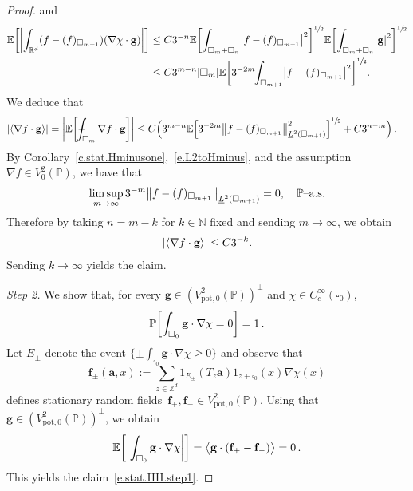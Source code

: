 \documentclass[11pt]{article} %
\let\oldsquare\square %
\renewcommand{\square}{\oldsquare}
\numberwithin{equation}{section}
\theoremstyle{definition}
\let\originalleft\left
\let\originalright\right
\renewcommand{\left}{\mathopen{}\mathclose\bgroup\originalleft}
\renewcommand{\right}{\aftergroup\egroup\originalright}
\newcommand*{\N}{\ensuremath{\mathbb{N}}}
\newcommand*{\Zd}{\ensuremath{\mathbb{Z}^d}}
\newcommand*{\Rd}{\ensuremath{\mathbb{R}^d}}
\newcommand{\f}{\mathbf{f}}
\newcommand{\g}{\mathbf{g}}
\newcommand{\pot}{\mathrm{pot}}
\renewcommand{\a}{\mathbf{a}}
\newcommand{\cu}{\square}
\renewcommand{\P}{\mathbb{P}}
\newcommand{\E}{\mathbb{E}}
\newcommand{\indc}{1}
\def\Xint#1{\mathchoice
{\XXint\displaystyle\textstyle{#1}}%
{\XXint\textstyle\scriptstyle{#1}}%
{\XXint\scriptstyle\scriptscriptstyle{#1}}%
{\XXint\scriptscriptstyle\scriptscriptstyle{#1}}%
\!\int}
\def\XXint#1#2#3{{\setbox0=\hbox{$#1{#2#3}{\int}$}
\vcenter{\hbox{$#2#3$}}\kern-.5\wd0}}
\def\fint{\Xint-}
\begin{document}
\begin{proof}
and
\begin{align*}
\E\left[
\left| \int_{\Rd} 
(f- (f)_{\cu_{m+1}} ) (\nabla \chi \cdot \g )
\right| \right]
&
\leq 
C3^{-n} 
\E\left[
\int_{\cu_m+\cu_n}
\left| f- (f)_{\cu_{m+1}} \right|^2 \right]^{\sfrac12}
\E \left[ 
\int_{\cu_m+\cu_n}
\left| \g \right|^2 \right]^{\sfrac12}
\\ & 
\leq
C3^{m-n} |\cu_m|
\E\biggl[
3^{-2m}
\fint_{\cu_{m+1}}
\left| f- (f)_{\cu_{m+1}} \right|^2 \biggr]^{\sfrac12}.
\end{align*}
We deduce that 
\begin{align*}
\left| \left\langle \nabla f \cdot \g \right\rangle \right|
&
=
\biggl| \E\biggl[ \fint_{\cu_m} \nabla f \cdot \g \biggr] \biggr|
\leq 
C
\Bigl( 
3^{m-n}
\E\left[
3^{-2m}
\left\| 
f- (f)_{\cu_{m+1}} \right\|_{\underline{L}^2(\cu_{m+1})}^2 \right]^{\sfrac12}
+
C 3^{n-m}
\Bigr)\,.
\end{align*}
By Corollary~\ref{c.stat.Hminusone},~\eqref{e.L2toHminus}, 
and the assumption $\nabla f\in V^2_0(\P)$, we have that 
\begin{align*}
\limsup_{m\to \infty} 
3^{-m}
\left\| 
f- (f)_{\cu_{m+1}} \right\|_{\underline{L}^2(\cu_{m+1})}
=0, \quad
\mbox{$\P$--a.s.}
\end{align*}
Therefore by taking $n=m-k$ for $k\in\N$ fixed and sending $m\to \infty$,
we obtain
\begin{align*}
\left| \left\langle \nabla f \cdot \g \right\rangle \right|
\leq 
C3^{-k}. 
\end{align*}
Sending $k\to \infty$ yields the claim. 

\smallskip

\emph{Step 2.}
We show that, for every $\g\in (V^2_{\pot,0}(\P))^\perp$ and $\chi\in C^\infty_c(\cu_0)$, 
\begin{equation}
\label{e.stat.HH.step1}
\P \left[ \int_{\cu_0} \g \cdot \nabla \chi =0 \right] = 1
\,. 
\end{equation}
Let $E_\pm$ denote the event $\{ \pm \int_{\cu_0} \g \cdot \nabla \chi \geq 0\}$ and observe that
\begin{equation}
\f_{\pm}(\a,x)
:=
\sum_{z\in\Zd} \indc_{E_{\pm}}(T_z\a) \indc_{z+\cu_0}(x) \nabla \chi(x)
\end{equation}
defines stationary random fields~$\f_+, \f_-\in V^2_{\pot,0}(\P)$. Using that~$\g\in (V^2_{\pot,0}(\P))^\perp$, we obtain 
\begin{equation}
\E \left[ \biggl| \int_{\cu_0} \g\cdot \nabla \chi \biggr| \right]
=
\bigl\langle \g \cdot (\f_{+}- \f_{-}) \bigr\rangle
=
0
\,. 
\end{equation}
This yields the claim~\eqref{e.stat.HH.step1}. 


\end{proof}
\end{document}
